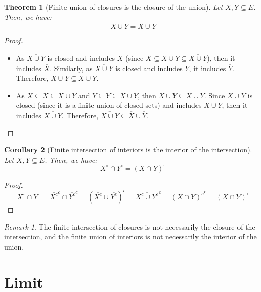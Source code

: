 \documentclass{article}
\newtheorem{theorem}{Theorem}[section]
\newtheorem{corollary}[theorem]{Corollary}
\theoremstyle{definition}
\theoremstyle{remark}
\newtheorem*{remark}{Remark}
\theoremstyle{example}
\theoremstyle{notation}
\newcommand{\inter}[1]{{{#1}^\circ}}
\begin{document}
\begin{theorem}[Finite union of closures is the closure of the union]
		Let $X, Y \subseteq E$. Then, we have:
				$$\overline{X} \cup \overline{Y} = \overline{X \cup Y}$$
\end{theorem}

\begin{proof}~
		\begin{itemize}
				\item As $\overline{X \cup Y}$ is closed and includes $X$ (since $X \subseteq X \cup Y \subseteq \overline{X \cup Y}$), then it includes $\overline{X}$. Similarly, as $\overline{X \cup Y}$ is closed and includes $Y$, it includes $\overline{Y}$. Therefore, $\overline{X} \cup \overline{Y} \subseteq \overline{X \cup Y}$.
				\item As $X \subseteq \overline{X} \subseteq \overline{X} \cup \overline{Y}$ and $Y \subseteq \overline{Y} \subseteq \overline{X} \cup \overline{Y}$, then $X \cup Y \subseteq \overline{X} \cup \overline{Y}$. Since $\overline{X} \cup \overline{Y}$ is closed (since it is a finite union of closed sets) and includes $X \cup Y$, then it includes $\overline{X \cup Y}$. Therefore, $\overline{X \cup Y} \subseteq \overline{X} \cup \overline{Y}$.
		\end{itemize}
\end{proof}

\begin{corollary}[Finite intersection of interiors is the interior of the intersection]
		Let $X, Y \subseteq E$. Then, we have:
				$$\inter{X} \cap \inter{Y} = \inter{(X \cap Y)}$$
\end{corollary}

\begin{proof}
		$$\inter{X} \cap \inter{Y} = \overline{X^c}^c \cap \overline{Y^c}^c = (\overline{X^c} \cup \overline{Y^c})^c = \overline{X^c \cup Y^c}^c = \overline{(X \cap Y)^c}^c = \inter{(X \cap Y)}$$
\end{proof}

\begin{remark}
		The finite intersection of closures is not necessarily the closure of the intersection, and the finite union of interiors is not necessarily the interior of the union.
\end{remark}

\section{Limit}
\end{document}
